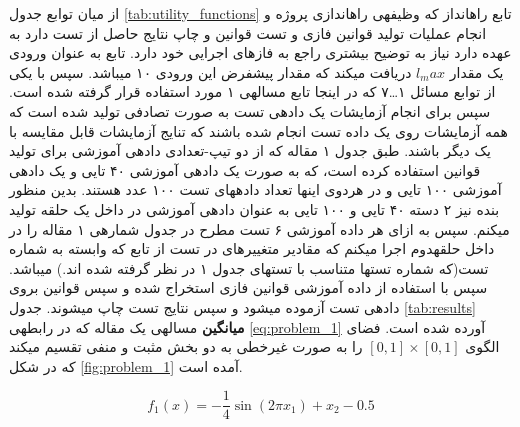 \documentclass[10pt,a4paper]{article}
\newcommand{\نیمفاصله}{\halfspace}
\renewcommand{\ }{\halfspace}
\renewcommand{\m}[1]{\lr{\mcode{#1}}}
\begin{document}
از میان توابع جدول
\ref{tab:utility_functions}
تابع راه\ انداز که وظیفه\ ی راه\ اندازی پروژه و انجام عملیات تولید قوانین فازی و تست قوانین و چاپ نتایج حاصل از تست دارد به عهده دارد نیاز به توضیح بیشتری راجع به فازهای اجرایی خود دارد.
\زیرزیرقسمت{تابع راه\ انداز}
تابع  به عنوان ورودی یک مقدار
$l_max$
دریافت می\ کند که مقدار پیش\ فرض این ورودی ۱۰ می\ باشد. سپس با یکی از توابع مسائل
۱{\ldots}۷
که در اینجا تابع مساله\ ی ۱ مورد استفاده قرار گرفته شده است. سپس برای انجام آزمایشات یک داده\ ی تست به صورت تصادفی تولید شده است که همه آزمایشات روی یک داده تست انجام شده باشند که تنایج آزمایشات قابل مقایسه با یک دیگر باشند.
طبق جدول ۱ مقاله که از دو تیپ-تعدادی داده\ ی آموزشی برای تولید قوانین استفاده کرده است، که به صورت یک داده\ ی آموزشی ۴۰ تایی و یک داده\ ی آموزشی ۱۰۰ تایی و در هردوی این\ ها تعداد داده\ های تست ۱۰۰ عدد هستند. بدین منظور بنده نیز ۲ دسته ۴۰ تایی  و ۱۰۰ تایی به عنوان داده\ ی آموزشی در داخل یک حلقه تولید میکنم. سپس به ازای هر داده آموزشی ۶ تست مطرح در جدول شماره\ ی ۱ مقاله را در داخل حلقه\ دوم اجرا میکنم که مقادیر متغییر\ های در تست از تابع \m{get_opt} که وابسته به شماره تست(که شماره تست\ ها متناسب با تست\ های جدول ۱ در نظر گرفته شده اند.) می\ باشد. سپس با استفاده از داده آموزشی قوانین فازی استخراج شده و سپس قوانین بروی داده\ ی تست آزموده می\ شود و سپس نتایج تست چاپ می\ شوند.
جدول
\ref{tab:results}
\textbf{میانگین}
مساله\ ی یک مقاله که در رابطه\ ی
\ref{eq:problem_1}
آورده شده است. فضای الگوی
$[0, 1] \times [0, 1]$
را به صورت غیرخطی به دو بخش مثبت و منفی تقسیم می\ کند که در شکل
\ref{fig:problem_1}
آمده است.
\begin{latin}
\begin{equation}
f_1(x) = -\frac{1}{4}\sin{(2{\pi}x_1)} + x_2 - 0.5
\label{eq:problem_1}
\end{equation}
\end{latin}
\end{document}
